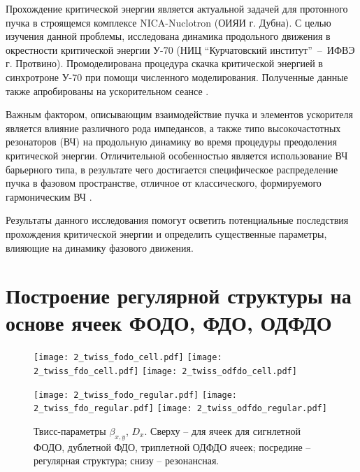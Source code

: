 \par Прохождение критической энергии является актуальной задачей для протонного пучка в строящемся комплексе NICA-Nuclotron (ОИЯИ г. Дубна). С целью изучения данной проблемы, исследована динамика продольного движения в окрестности критической энергии У-70 (НИЦ “Курчатовский институт”~--~ИФВЭ г. Протвино). Промоделирована процедура скачка критической энергией в синхротроне У-70 при помощи численного моделирования. Полученные данные также апробированы на ускорительном сеансе \cite{Kolokolchikov:2025_U70}.

\par Важным фактором, описывающим взаимодействие пучка и элементов ускорителя является влияние различного рода импедансов, а также типо высокочастотных резонаторов (ВЧ) на продольную динамику во время процедуры преодоления критической энергии. Отличительной особенностью является использование ВЧ барьерного типа, в результате чего достигается специфическое распределение пучка в фазовом пространстве, отличное от классического, формируемого гармоническим ВЧ \cite{hans:bb}.

\par Результаты данного исследования помогут осветить потенциальные последствия прохождения критической энергии и определить существенные параметры, влияющие на динамику фазового движения.

	\section{Построение регулярной структуры на основе ячеек ФОДО, ФДО, ОДФДО}\label{sec:transition_jump/FODO_FDO}



\begin{figure} [h!]

   \texttt{[image: 2\_twiss\_fodo\_cell.pdf]}
   \texttt{[image: 2\_twiss\_fdo\_cell.pdf]}
   \texttt{[image: 2\_twiss\_odfdo\_cell.pdf]}

   \texttt{[image: 2\_twiss\_fodo\_regular.pdf]}
   \texttt{[image: 2\_twiss\_fdo\_regular.pdf]}
   \texttt{[image: 2\_twiss\_odfdo\_regular.pdf]}

   \caption{Твисс-параметры $\beta_{x,y}$, $D_{x}$. Сверху -- для ячеек для сигнлетной ФОДО, дублетной ФДО, триплетной ОДФДО ячеек; посредине -- регулярная структура; снизу -- резонансная.}
   \label{fig:fodo_fdo_odfdo_regular}
\end{figure}

